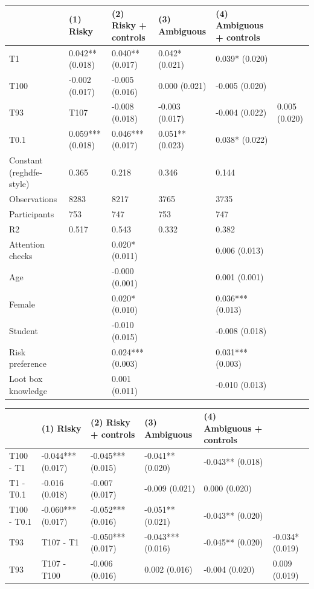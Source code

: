 \begin{tabular}{lllll}
\toprule
 & (1) Risky & (2) Risky + controls & (3) Ambiguous & (4) Ambiguous + controls \\
\midrule
T1 & 0.042** (0.018) & 0.040** (0.017) & 0.042* (0.021) & 0.039* (0.020) \\
T100 & -0.002 (0.017) & -0.005 (0.016) & 0.000 (0.021) & -0.005 (0.020) \\
T93&T107 & -0.008 (0.018) & -0.003 (0.017) & -0.004 (0.022) & 0.005 (0.020) \\
T0.1 & 0.059*** (0.018) & 0.046*** (0.017) & 0.051** (0.023) & 0.038* (0.022) \\
Constant (reghdfe-style) & 0.365 & 0.218 & 0.346 & 0.144 \\
Observations & 8283 & 8217 & 3765 & 3735 \\
Participants & 753 & 747 & 753 & 747 \\
R2 & 0.517 & 0.543 & 0.332 & 0.382 \\
Attention checks &  & 0.020* (0.011) &  & 0.006 (0.013) \\
Age &  & -0.000 (0.001) &  & 0.001 (0.001) \\
Female &  & 0.020* (0.010) &  & 0.036*** (0.013) \\
Student &  & -0.010 (0.015) &  & -0.008 (0.018) \\
Risk preference &  & 0.024*** (0.003) &  & 0.031*** (0.003) \\
Loot box knowledge &  & 0.001 (0.011) &  & -0.010 (0.013) \\
\bottomrule
\end{tabular}
\begin{tabular}{lllll}
\toprule
 & (1) Risky & (2) Risky + controls & (3) Ambiguous & (4) Ambiguous + controls \\
\midrule
T100 - T1 & -0.044*** (0.017) & -0.045*** (0.015) & -0.041** (0.020) & -0.043** (0.018) \\
T1 - T0.1 & -0.016 (0.018) & -0.007 (0.017) & -0.009 (0.021) & 0.000 (0.020) \\
T100 - T0.1 & -0.060*** (0.017) & -0.052*** (0.016) & -0.051** (0.021) & -0.043** (0.020) \\
T93&T107 - T1 & -0.050*** (0.017) & -0.043*** (0.016) & -0.045** (0.020) & -0.034* (0.019) \\
T93&T107 - T100 & -0.006 (0.016) & 0.002 (0.016) & -0.004 (0.020) & 0.009 (0.019) \\
\bottomrule
\end{tabular}
